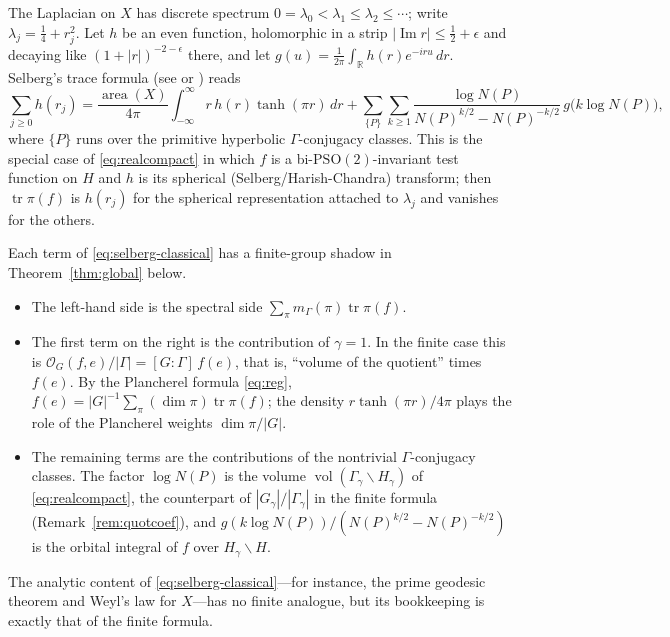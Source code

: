 \documentclass[12pt]{article}
\theoremstyle{remark}
\newcommand{\tr}{\operatorname{tr}}
\newcommand{\Orb}{\mathcal O}
\begin{document}
The Laplacian on $X$ has discrete spectrum
$0=\lambda_0<\lambda_1\le\lambda_2\le\cdots$; write
$\lambda_j=\tfrac14+r_j^2$.  Let $h$ be an even function, holomorphic
in a strip $|\operatorname{Im}r|\le\tfrac12+\epsilon$ and decaying like
$(1+|r|)^{-2-\epsilon}$ there, and let
$g(u)=\frac1{2\pi}\int_{\mathbb R}h(r)e^{-iru}\,dr$.  Selberg's trace
formula (see \cite[Ch.~10]{Iwaniec2002} or \cite{Hejhal1976}) reads
\begin{equation}\label{eq:selberg-classical}
 \sum_{j\ge0}h(r_j)
 =\frac{\operatorname{area}(X)}{4\pi}
   \int_{-\infty}^{\infty}r\,h(r)\tanh(\pi r)\,dr
 +\sum_{\{P\}}\sum_{k\ge1}
   \frac{\log N(P)}{N(P)^{k/2}-N(P)^{-k/2}}\,g\bigl(k\log N(P)\bigr),
\end{equation}
where $\{P\}$ runs over the primitive hyperbolic $\Gamma$-conjugacy
classes.  This is the special case of \eqref{eq:realcompact} in which
$f$ is a bi-$\mathrm{PSO}(2)$-invariant test function on $H$ and $h$ is
its spherical (Selberg/Harish-Chandra) transform; then $\tr\pi(f)$ is
$h(r_j)$ for the spherical representation attached to $\lambda_j$ and
vanishes for the others.

Each term of \eqref{eq:selberg-classical} has a finite-group shadow in
Theorem~\ref{thm:global} below.
\begin{itemize}[itemsep=2pt]
\item The left-hand side is the spectral side
 $\sum_\pi m_\Gamma(\pi)\tr\pi(f)$.
\item The first term on the right is the contribution of $\gamma=1$.
 In the finite case this is
 $\Orb_G(f,e)/|\Gamma|=[G:\Gamma]\,f(e)$, that is,
 ``volume of the quotient'' times $f(e)$.  By the Plancherel formula
 \eqref{eq:reg}, $f(e)=|G|^{-1}\sum_\pi(\dim\pi)\tr\pi(f)$; the
 density $r\tanh(\pi r)/4\pi$ plays the role of the Plancherel weights
 $\dim\pi/|G|$.
\item The remaining terms are the contributions of the nontrivial
 $\Gamma$-conjugacy classes.  The factor $\log N(P)$ is the volume
 $\operatorname{vol}(\Gamma_\gamma\backslash H_\gamma)$ of
 \eqref{eq:realcompact}, the counterpart of $|G_\gamma|/|\Gamma_\gamma|$
 in the finite formula (Remark~\ref{rem:quotcoef}), and
 $g(k\log N(P))/(N(P)^{k/2}-N(P)^{-k/2})$ is the orbital integral of
 $f$ over $H_\gamma\backslash H$.
\end{itemize}
The analytic content of \eqref{eq:selberg-classical}---for instance,
the prime geodesic theorem and Weyl's law for $X$---has no finite
analogue, but its bookkeeping is exactly that of the finite formula.
\end{document}
